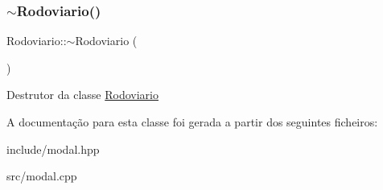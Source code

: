 \subsubsection{\texorpdfstring{$\sim$\+Rodoviario()}{~Rodoviario()}}
{\footnotesize\ttfamily Rodoviario\+::$\sim$\+Rodoviario (\begin{DoxyParamCaption}{ }\end{DoxyParamCaption})}

Destrutor da classe \hyperlink{classRodoviario}{Rodoviario}

A documentação para esta classe foi gerada a partir dos seguintes ficheiros\+:\begin{DoxyCompactItemize}
\item 
include/modal.\+hpp\item 
src/modal.\+cpp\end{DoxyCompactItemize}
